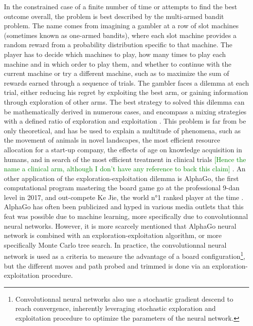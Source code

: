 In the constrained case of a finite number of time or attempts to find the best outcome overall, the problem is best described by the multi-armed bandit problem. The name comes from imagining a gambler at a row of slot machines (sometimes known as one-armed bandits), where each slot machine provides a random reward from a probability distribution specific to that machine. The player has to decide which machines to play, how many times to play each machine and in which order to play them, and whether to continue with the current machine or try a different machine, such as to maximize the sum of rewards earned through a sequence of trials.
The gambler faces a dilemma at each trial, either reducing his regret by exploiting the best arm, or gaining information through exploration of other arms.
The best strategy to solved this dilemma can be mathematically derived in numerous cases, and encompass a mixing strategies with a defined ratio of exploration and exploitation \citep{Auer2002,Kocsis2006,Furnkranz2006}.
This problem is far from be only theoretical, and has be used to explain a multitude of phenomena, such as the movement of animals in novel landscapes, the most efficient resource allocation for a start-up company, the effects of age on knowledge acquisition in humans, and in search of the most efficient treatment in clinical trials \textcolor{GREEN}{[Hence the name a clinical arm, although I don't have any reference to back this claim]} \citep{Berger-Tal2014, March}. 
An other application of the exploration-exploitation dilemma is AlphaGo, the first computational program mastering the board game go at the professional 9-dan level in 2017, and out-compete Ke Jie, the world n°1 ranked player at the time \citep{Silver2017, Silver2018}.
AlphaGo has often been publicized and hyped in various media outlets that this feat was possible due to machine learning, more specifically due to convolutionnal neural networks.
However, it is more scarcely mentioned that AlphaGo neural network is combined with an exploration-exploitation algorithm, or more specifically Monte Carlo tree search. 
In practice, the convolutionnal neural network is used as a criteria to measure the advantage of a board configuration\footnote{Convolutionnal neural networks also use a stochastic gradient descend to reach convergence, inherently leveraging stochastic exploration and exploitation procedure to optimize the parameters of the neural network.}, but the different moves and path probed and trimmed is done via an exploration-exploitation procedure. 


